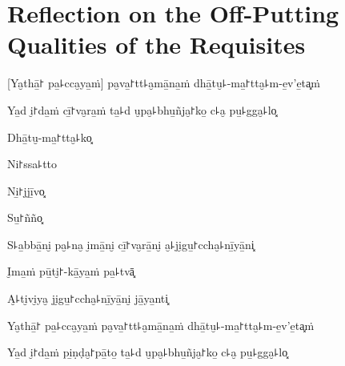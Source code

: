 \chapter[Off-Putting Qualities of the Requisites]{Reflection on the Off-Putting Qualities of the Requisites}


\begin{leader}
\end{leader}

[Ya̮thā̱꜓ pa̱꜕cca̮ya̱ṁ] pa̮va̱꜓tt꜕a̮mā̱na̱ṁ dhā̱tu̮꜕-ma̱꜓tta̮꜕m-e̱v'e̱ta͓ṁ


Ya̱d i̮꜓da̱ṁ cī̱꜓va̮ra̱ṁ ta̱꜕d u̮pa̮꜕bhu̱ñja̮꜓ko̱ c꜕a̮ pu̱꜕gga̮꜕lo͓


Dhā̱tu̮-ma̱꜓tta̮꜕ko͓


Ni꜓ssa꜕tto


Ni̱꜓jjī̱vo͓


Su̱꜓ñño͓


S꜕a̱bbā̱ni̮ pa̮꜕na̮ i̮mā̱ni̮ cī̱꜓va̮rā̱ni̮ a̮꜕ji̮gu̱꜓ccha̮꜕nī̱yā̱ni͓


\clearpage

I̮ma̱ṁ pū̱ti̮꜓-kā̱ya̱ṁ pa̱꜕tvā͓


A̮꜕ti̮vi̮ya̮ ji̮gu̱꜓ccha̮꜕nī̱yā̱ni̮ jā̱ya̱nti͓


Ya̮thā̱꜓ pa̱꜕cca̮ya̱ṁ pa̮va̱꜓tt꜕a̮mā̱na̱ṁ dhā̱tu̮꜕-ma̱꜓tta̮꜕m-e̱v'e̱ta͓ṁ


Ya̱d i̮꜓da̱ṁ pi̱ṇḍa̮꜓pā̱to̱ ta̱꜕d u̮pa̮꜕bhu̱ñja̮꜓ko̱ c꜕a̮ pu̱꜕gga̮꜕lo͓



